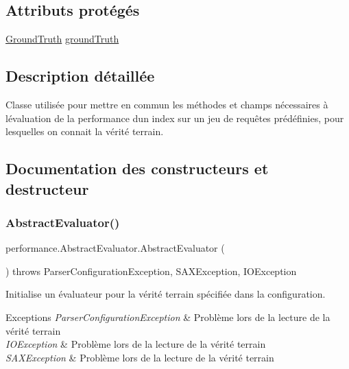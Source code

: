 \subsection*{Attributs protégés}
\begin{DoxyCompactItemize}
\item 
\hyperlink{classperformance_1_1GroundTruth}{Ground\+Truth} \hyperlink{classperformance_1_1AbstractEvaluator_a75eb2b45c3b578fe523ca79f9e31e7e2}{ground\+Truth}
\end{DoxyCompactItemize}


\subsection{Description détaillée}
Classe utilisée pour mettre en commun les méthodes et champs nécessaires à l\textquotesingle{}évaluation de la performance d\textquotesingle{}un index sur un jeu de requêtes prédéfinies, pour lesquelles on connait la vérité terrain. 

\subsection{Documentation des constructeurs et destructeur}
\mbox{\label{classperformance_1_1AbstractEvaluator_a2a0f90a0b3c8e8306b2d95086bf7a042}} 
\subsubsection{\texorpdfstring{Abstract\+Evaluator()}{AbstractEvaluator()}}
{\footnotesize\ttfamily performance.\+Abstract\+Evaluator.\+Abstract\+Evaluator (\begin{DoxyParamCaption}{ }\end{DoxyParamCaption}) throws Parser\+Configuration\+Exception, S\+A\+X\+Exception, I\+O\+Exception}

Initialise un évaluateur pour la vérité terrain spécifiée dans la configuration.


\begin{DoxyExceptions}{Exceptions}
{\em Parser\+Configuration\+Exception} & Problème lors de la lecture de la vérité terrain \\
\hline
{\em I\+O\+Exception} & Problème lors de la lecture de la vérité terrain \\
\hline
{\em S\+A\+X\+Exception} & Problème lors de la lecture de la vérité terrain \\
\hline
\end{DoxyExceptions}


